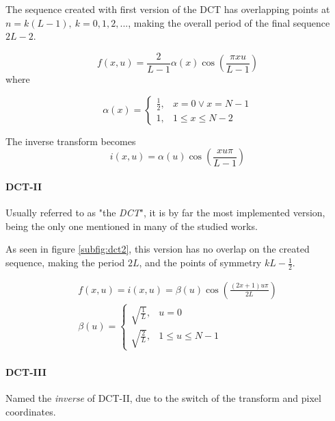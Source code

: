 The sequence created with first version of the DCT has overlapping points at $n = k(L-1) ,\ k = 0,1,2,...$, making the overall period of the final sequence $2L-2$.

\begin{equation}
    f(x,u) = \frac{2}{L-1}\alpha(x)\cos\left(\frac{\pi xu}{L-1}\right)
\end{equation}
where

\begin{equation}
    \alpha(x)= \begin{cases}
                    \frac{1}{2}, & x=0 \lor x = N-1 \\
                    1, & 1 \leq x \leq N-2
                \end{cases}
\end{equation}

The inverse transform becomes
\begin{equation}
    i(x,u) = \alpha(u)\cos\left(\frac{xu\pi}{L-1}\right)
\end{equation}

\paragraph{DCT-II}

Usually referred to as "the \emph{DCT}", it is by far the most implemented version, being the only one mentioned in many of the studied works.

As seen in figure \ref{subfig:dct2}, this version has no overlap on the created sequence, making the period $2L$, and the points of symmetry $kL - \frac{1}{2}$.

\begin{gather}
    f(x,u) = i(x,u) = \beta(u)\cos\left(\frac{(2x+1)u\pi }{2L}\right) \\
    \beta(u)= \begin{cases}
                    \sqrt{\frac{1}{L}}, & u=0 \\
                    \sqrt{\frac{2}{L}}, & 1 \leq u \leq N-1
                \end{cases}
\end{gather}

\paragraph{DCT-III}
Named the \emph{inverse} of DCT-II, due to the switch of the transform and pixel coordinates.

